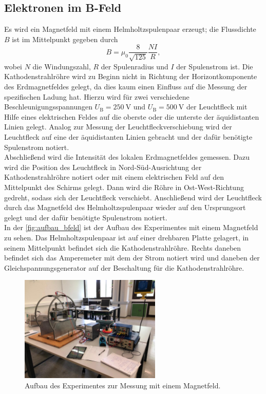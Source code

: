 \subsection{Elektronen im B-Feld}

    Es wird ein Magnetfeld mit einem Helmholtzspulenpaar erzeugt; die Flussdichte $B$ ist im Mittelpunkt gegeben durch 
    \begin{equation} \label{eqn:B}
        B = \mu_0 \frac{8}{\sqrt{125}} \frac{N I}{R},
    \end{equation}
    wobei $N$ die Windungszahl, $R$ der Spulenradius und $I$ der Spulenstrom ist. Die Kathodenstrahlröhre wird zu Beginn nicht in Richtung der Horizontkomponente
    des Erdmagnetfeldes gelegt, da dies kaum einen Einfluss auf die Messung der spezifischen Ladung hat. Hierzu wird für zwei verschiedene Beschleunigungsspannungen 
    $U_{\text{B}} = \SI{250}{\volt}$ und $U_{\text{B}} = \SI{500}{\volt}$ der Leuchtfleck mit Hilfe eines elektrischen Feldes auf die oberste oder die unterste der
    äquidistanten Linien gelegt. Analog zur Messung der Leuchtfleckverschiebung wird der Leuchtfleck auf eine der äquidistanten Linien gebracht und der dafür benötigte
    Spulenstrom notiert. \\

    \noindent Abschließend wird die Intensität des lokalen Erdmagnetfeldes gemessen. Dazu wird die Position des Leuchtfleck in Nord-Süd-Ausrichtung der 
    Kathodenstrahlröhre notiert oder mit einem elektrischen Feld auf den Mittelpunkt des Schirms gelegt. Dann wird die Röhre in Ost-West-Richtung gedreht, sodass
    sich der Leuchtfleck verschiebt. Anschließend wird der Leuchtfleck durch das Magnetfeld des Helmholtzspulenpaar wieder auf den Ursprungsort gelegt und der 
    dafür benötigte Spulenstrom notiert. \\

    \noindent In der \autoref{fig:aufbau_bfeld} ist der Aufbau des Experimentes mit einem Magnetfeld zu sehen. Das Helmholtzspulenpaar ist auf einer drehbaren
    Platte gelagert, in seinem Mittelpunkt befindet sich die Kathodenstrahlröhre. Rechts daneben befindet sich das Amperemeter mit dem der Strom notiert wird und 
    daneben der Gleichspannungsgenerator auf der Beschaltung für die Kathodenstrahlröhre. 

    \begin{figure}[H]
        \centering
        \includegraphics[width=0.6\textwidth]{bilder/foto_magnet.jpeg}
        \caption{Aufbau des Experimentes zur Messung mit einem Magnetfeld.}
        \label{fig:aufbau_bfeld}
    \end{figure} 


